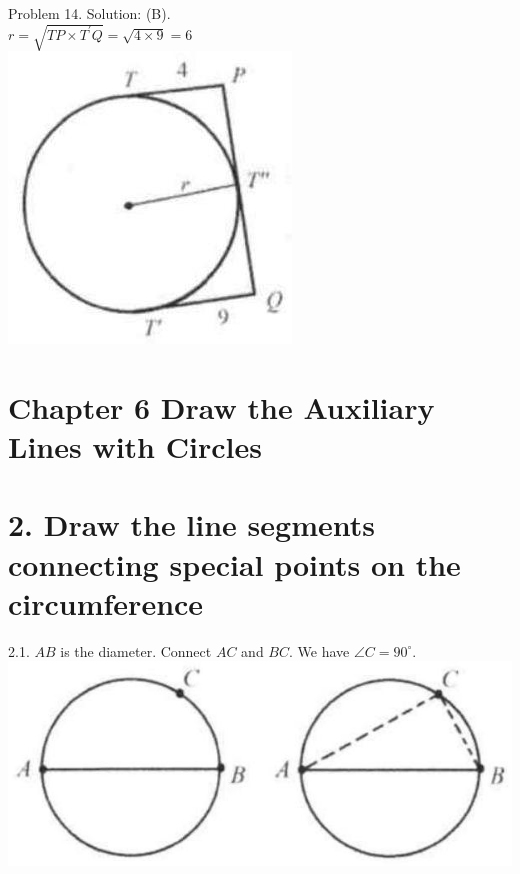 \documentclass[10pt]{article}
\begin{document}
Problem 14. Solution: (B).\\
\(r=\sqrt{T P \times T^{\prime} Q}=\sqrt{4 \times 9}=6\)\\
\includegraphics[max width=\textwidth, center]{2025_04_17_97bc1f7e44d93c271a88g-161}

\section*{Chapter 6 Draw the Auxiliary Lines with Circles}
\section*{2. Draw the line segments connecting special points on the circumference}
2.1. \(A B\) is the diameter. Connect \(A C\) and \(B C\). We have \(\angle C=90^{\circ}\).\\
\includegraphics[max width=\textwidth, center]{2025_04_17_97bc1f7e44d93c271a88g-162(1)}
\end{document}
